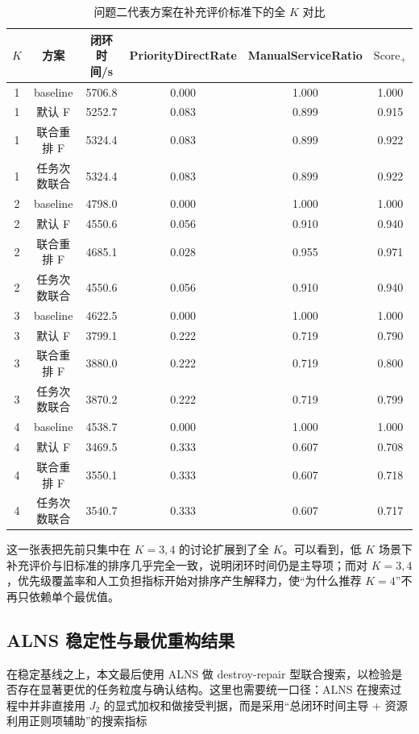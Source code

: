 \documentclass[12pt]{article}
\begin{document}
\begin{table}[H]
\centering
\caption{问题二代表方案在补充评价标准下的全 $K$ 对比}
\label{tab:problem2-expanded-eval-fullk}
\small
\setlength{\tabcolsep}{3.5pt}
\begin{tabular}{cccccc}
\toprule
$K$ & 方案 & 闭环时间/s & PriorityDirectRate & ManualServiceRatio & $\text{Score}_{+}$ \\
\midrule
1 & baseline & 5706.8 & 0.000 & 1.000 & 1.000 \\
1 & 默认 F & 5252.7 & 0.083 & 0.899 & 0.915 \\
1 & 联合重排 F & 5324.4 & 0.083 & 0.899 & 0.922 \\
1 & 任务次数联合 & 5324.4 & 0.083 & 0.899 & 0.922 \\
2 & baseline & 4798.0 & 0.000 & 1.000 & 1.000 \\
2 & 默认 F & 4550.6 & 0.056 & 0.910 & 0.940 \\
2 & 联合重排 F & 4685.1 & 0.028 & 0.955 & 0.971 \\
2 & 任务次数联合 & 4550.6 & 0.056 & 0.910 & 0.940 \\
3 & baseline & 4622.5 & 0.000 & 1.000 & 1.000 \\
3 & 默认 F & 3799.1 & 0.222 & 0.719 & 0.790 \\
3 & 联合重排 F & 3880.0 & 0.222 & 0.719 & 0.800 \\
3 & 任务次数联合 & 3870.2 & 0.222 & 0.719 & 0.799 \\
4 & baseline & 4538.7 & 0.000 & 1.000 & 1.000 \\
4 & 默认 F & 3469.5 & 0.333 & 0.607 & 0.708 \\
4 & 联合重排 F & 3550.1 & 0.333 & 0.607 & 0.718 \\
4 & 任务次数联合 & 3540.7 & 0.333 & 0.607 & 0.717 \\
\bottomrule
\end{tabular}
\normalsize
\end{table}

这一张表把先前只集中在 $K=3,4$ 的讨论扩展到了全 $K$。可以看到，低 $K$ 场景下补充评价与旧标准的排序几乎完全一致，说明闭环时间仍是主导项；而对 $K=3,4$，优先级覆盖率和人工负担指标开始对排序产生解释力，使“为什么推荐 $K=4$”不再只依赖单个最优值。

\subsection{ALNS 稳定性与最优重构结果}
在稳定基线之上，本文最后使用 ALNS 做 destroy-repair 型联合搜索，以检验是否存在显著更优的任务粒度与确认结构。这里也需要统一口径：ALNS 在搜索过程中并非直接用 $J_2$ 的显式加权和做接受判据，而是采用“总闭环时间主导 + 资源利用正则项辅助”的搜索指标
\end{document}
